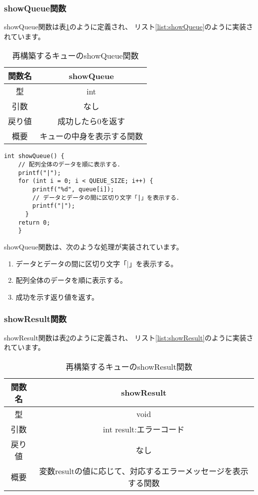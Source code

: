 \documentclass[a4j]{jarticle}
\begin{document}
\subsubsection{showQueue関数}
showQueue関数は表\ref{table:showQueue}のように定義され、
リスト\ref{list:showQueue}のように実装されています。
\begin{table}[htbp]
  \centering
  \caption{再構築するキューのshowQueue関数}
  \label{table:showQueue}
  \begin{tabular}{|c|c|}
    \hline
    関数名 & showQueue     \\
    \hline
    型   & int           \\
    \hline
    引数  & なし            \\
    \hline
    戻り値 & 成功したら0を返す     \\
    \hline
    概要  & キューの中身を表示する関数 \\
    \hline
  \end{tabular}
\end{table}

\begin{lstlisting}[caption=再構築するキューのshowQueue関数の実装,label=list:showQueue]
  int showQueue() {
    // 配列全体のデータを順に表示する．
    printf("|");
    for (int i = 0; i < QUEUE_SIZE; i++) {
        printf("%d", queue[i]);
        // データとデータの間に区切り文字「|」を表示する．
        printf("|");
      }
    return 0;
    }
\end{lstlisting}

showQueue関数は、次のような処理が実装されています。
\begin{enumerate}
  \item データとデータの間に区切り文字「|」を表示する。
  \item 配列全体のデータを順に表示する。
  \item 成功を示す返り値を返す。
\end{enumerate}

\subsubsection{showResult関数}
showResult関数は表\ref{table:showResult}のように定義され、
リスト\ref{list:showResult}のように実装されています。
\begin{table}[htbp]
  \centering
  \caption{再構築するキューのshowResult関数}
  \label{table:showResult}
  \begin{tabular}{|c|c|}
    \hline
    関数名 & showResult                         \\
    \hline
    型   & void                               \\
    \hline
    引数  & int result:エラーコード                  \\
    \hline
    戻り値 & なし                                 \\
    \hline
    概要  & 変数resultの値に応じて、対応するエラーメッセージを表示する関数 \\
    \hline
  \end{tabular}
\end{table}
\end{document}
